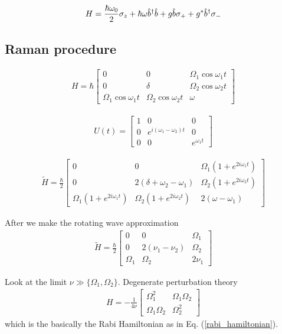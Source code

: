 \begin{align}
  H = \frac{\hbar \omega_0}{2} \mathbf{\sigma}_z + \hbar \omega \hat{b}^\dagger\hat{b} + g\hat{b} \mathbf{\sigma}_{+} + g^{*}\hat{b}^\dagger \mathbf{\sigma}_{-}
\end{align}

\subsection{Raman procedure}


\begin{align}
  H=\hbar
  \begin{bmatrix}
    0 & 0 & \Omega_1 \cos\omega_1 t \\
    0 & \delta & \Omega_2 \cos\omega_2 t \\
    \Omega_1 \cos\omega_1 t & \Omega_2 \cos\omega_2 t & \omega
  \end{bmatrix}
\end{align}

\begin{align}
  U(t) = 
  \begin{bmatrix}
    1 & 0 & 0 \\
    0 & e^{i(\omega_1 - \omega_2)t} & 0 \\
    0 & 0 & e^{\omega_1 t}
  \end{bmatrix}
\end{align}

\begin{align}
  \tilde{H}=\frac{\hbar}{2}
  \begin{bmatrix}
    0 & 0 & \Omega_1(1+e^{2i\omega_1 t}) \\
    0 & 2(\delta + \omega_2 - \omega_1) & \Omega_2 (1+e^{2i\omega_2 t}) \\
    \Omega_1(1+e^{2i\omega_1 t}) & \Omega_2 (1+e^{2i\omega_2 t}) & 2(\omega - \omega_1)
  \end{bmatrix}
\end{align}

After we make the rotating wave approximation
\begin{align}
  \tilde{H}=\frac{\hbar}{2}
  \begin{bmatrix}
    0 & 0 & \Omega_1 \\
    0 & 2(\nu_1 - \nu_2) & \Omega_2  \\
    \Omega_1 & \Omega_2  & 2\nu_1
  \end{bmatrix}
\end{align}

Look at the limit $\nu \gg \{\Omega_1, \Omega_2\}$.  Degenerate perturbation theory
\begin{align}
  H = -\frac{1}{4\nu}
  \begin{bmatrix}
    \Omega_1^2 & \Omega_1 \Omega_2 \\
    \Omega_1\Omega_2 & \Omega_2^2
  \end{bmatrix}
\end{align}
which is the basically the Rabi Hamiltonian as in Eq. (\ref{rabi_hamiltonian}).

